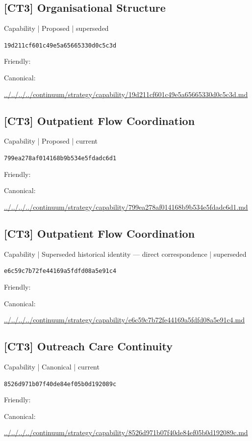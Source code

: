 \documentclass[10pt,a4paper]{article}
\begin{document}
\subsection*{[CT3] Organisational Structure}
{\small Capability | Proposed | superseded}\par
\texttt{19d211cf601c49e5a65665330d0c5c3d}\par
Friendly: \par
Canonical: \par
{\footnotesize\url{../../../../continuum/strategy/capability/19d211cf601c49e5a65665330d0c5c3d.md}}\par
\subsection*{[CT3] Outpatient Flow Coordination}
{\small Capability | Proposed | current}\par
\texttt{799ea278af014168b9b534e5fdadc6d1}\par
Friendly: \par
Canonical: \par
{\footnotesize\url{../../../../continuum/strategy/capability/799ea278af014168b9b534e5fdadc6d1.md}}\par
\subsection*{[CT3] Outpatient Flow Coordination}
{\small Capability | Superseded historical identity — direct correspondence | superseded}\par
\texttt{e6c59c7b72fe44169a5fdfd08a5e91c4}\par
Friendly: \par
Canonical: \par
{\footnotesize\url{../../../../continuum/strategy/capability/e6c59c7b72fe44169a5fdfd08a5e91c4.md}}\par
\subsection*{[CT3] Outreach Care Continuity}
{\small Capability | Canonical | current}\par
\texttt{8526d971b07f40de84ef05b0d192089c}\par
Friendly: \par
Canonical: \par
{\footnotesize\url{../../../../continuum/strategy/capability/8526d971b07f40de84ef05b0d192089c.md}}\par
\end{document}
